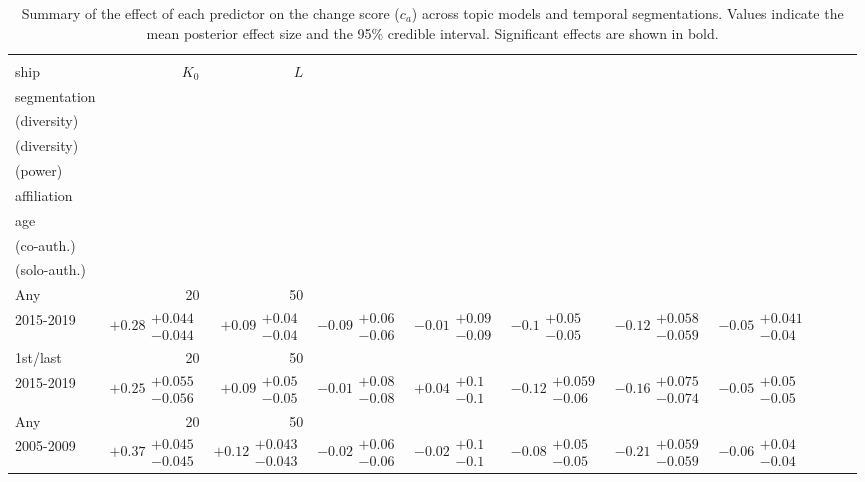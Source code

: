 \begin{table}[H]
\caption{Summary of the effect of each predictor on the change score ($c_a$) across topic models and temporal segmentations. Values indicate the mean posterior effect size and the 95\% credible interval. Significant effects are shown in bold.}
\label{table:full_summary_change}
\renewcommand{\arraystretch}{2}\fontsize{6}{7}\selectfont\begin{tabular}{lrrllllllll}
\toprule
\makecell{Author-\\ ship} & $K_0$ & $L$ & \makecell{Temporal \\ segmentation} & \makecell{Intell. capital \\ (diversity)} & \makecell{Soc. capital \\ (diversity)} & \makecell{Soc. capital \\ (power)} & \makecell{Stable \\ affiliation} & \makecell{Academic \\ age} & \makecell{Prod. \\ (co-auth.)} & \makecell{Prod. \\ (solo-auth.)} \\
\midrule
Any & 20 & 50 & \makecell{2000-2009 \\ 2015-2019} & $\bm{+0.28}\substack{+0.044 \\ -0.044}$ & $\bm{+0.09}\substack{+0.04 \\ -0.04}$ & $\bm{-0.09}\substack{+0.06 \\ -0.06}$ & $-0.01\substack{+0.09 \\ -0.09}$ & $\bm{-0.1}\substack{+0.05 \\ -0.05}$ & $\bm{-0.12}\substack{+0.058 \\ -0.059}$ & $\bm{-0.05}\substack{+0.041 \\ -0.04}$ \\
1st/last & 20 & 50 & \makecell{2000-2009 \\ 2015-2019} & $\bm{+0.25}\substack{+0.055 \\ -0.056}$ & $\bm{+0.09}\substack{+0.05 \\ -0.05}$ & $-0.01\substack{+0.08 \\ -0.08}$ & $+0.04\substack{+0.1 \\ -0.1}$ & $\bm{-0.12}\substack{+0.059 \\ -0.06}$ & $\bm{-0.16}\substack{+0.075 \\ -0.074}$ & $-0.05\substack{+0.05 \\ -0.05}$ \\
Any & 20 & 50 & \makecell{2000-2004 \\ 2005-2009} & $\bm{+0.37}\substack{+0.045 \\ -0.045}$ & $\bm{+0.12}\substack{+0.043 \\ -0.043}$ & $-0.02\substack{+0.06 \\ -0.06}$ & $-0.02\substack{+0.1 \\ -0.1}$ & $\bm{-0.08}\substack{+0.05 \\ -0.05}$ & $\bm{-0.21}\substack{+0.059 \\ -0.059}$ & $\bm{-0.06}\substack{+0.04 \\ -0.04}$ \\

\end{tabular}
\end{table}
